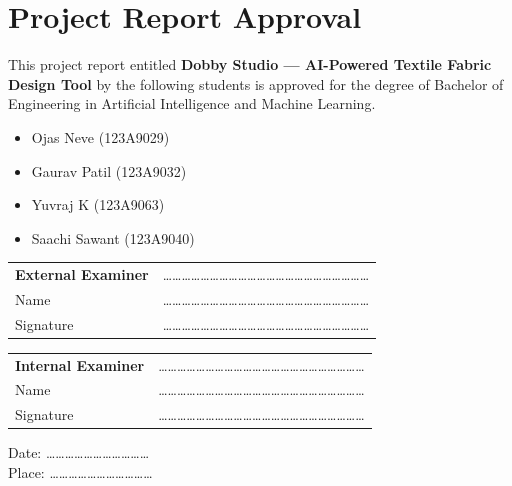 \chapter*{Project Report Approval}

\vspace{0.5cm}

This project report entitled \textbf{Dobby Studio — AI-Powered Textile Fabric Design Tool} by the following students is approved for the degree of Bachelor of Engineering in Artificial Intelligence and Machine Learning.

\begin{itemize}
    \item Ojas Neve (123A9029)
    \item Gaurav Patil (123A9032)
    \item Yuvraj K (123A9063)
    \item Saachi Sawant (123A9040)
\end{itemize}

\vspace{1.5cm}

\noindent
\begin{tabular}{ll}
\textbf{External Examiner} & ………………………………………………………… \\
Name & ………………………………………………………… \\
Signature & ………………………………………………………… \\
\end{tabular}

\vspace{1cm}

\noindent
\begin{tabular}{ll}
\textbf{Internal Examiner} & ………………………………………………………… \\
Name & ………………………………………………………… \\
Signature & ………………………………………………………… \\
\end{tabular}

\vspace{1cm}

\noindent Date: …………………………… \\
\noindent Place: ……………………………
